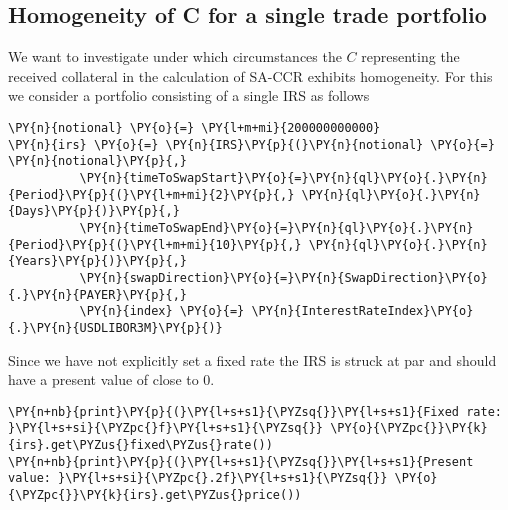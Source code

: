     

    
    \hypertarget{homogeneity-of-c-for-a-single-trade-portfolio}{%
\subsection{Homogeneity of C for a single trade
portfolio}\label{homogeneity-of-c-for-a-single-trade-portfolio}}

    We want to investigate under which circumstances the \(C\) representing
the received collateral in the calculation of SA-CCR exhibits
homogeneity. For this we consider a portfolio consisting of a single IRS
as follows

    \begin{tcolorbox}[breakable, size=fbox, boxrule=1pt, pad at break*=1mm,colback=cellbackground, colframe=cellborder]
\begin{Verbatim}[commandchars=\\\{\}]
\PY{n}{notional} \PY{o}{=} \PY{l+m+mi}{200000000000}
\PY{n}{irs} \PY{o}{=} \PY{n}{IRS}\PY{p}{(}\PY{n}{notional} \PY{o}{=} \PY{n}{notional}\PY{p}{,}
          \PY{n}{timeToSwapStart}\PY{o}{=}\PY{n}{ql}\PY{o}{.}\PY{n}{Period}\PY{p}{(}\PY{l+m+mi}{2}\PY{p}{,} \PY{n}{ql}\PY{o}{.}\PY{n}{Days}\PY{p}{)}\PY{p}{,}
          \PY{n}{timeToSwapEnd}\PY{o}{=}\PY{n}{ql}\PY{o}{.}\PY{n}{Period}\PY{p}{(}\PY{l+m+mi}{10}\PY{p}{,} \PY{n}{ql}\PY{o}{.}\PY{n}{Years}\PY{p}{)}\PY{p}{,}
          \PY{n}{swapDirection}\PY{o}{=}\PY{n}{SwapDirection}\PY{o}{.}\PY{n}{PAYER}\PY{p}{,}
          \PY{n}{index} \PY{o}{=} \PY{n}{InterestRateIndex}\PY{o}{.}\PY{n}{USDLIBOR3M}\PY{p}{)}
\end{Verbatim}
\end{tcolorbox}

    Since we have not explicitly set a fixed rate the IRS is struck at par
and should have a present value of close to 0.

    \begin{tcolorbox}[breakable, size=fbox, boxrule=1pt, pad at break*=1mm,colback=cellbackground, colframe=cellborder]
\begin{Verbatim}[commandchars=\\\{\}]
\PY{n+nb}{print}\PY{p}{(}\PY{l+s+s1}{\PYZsq{}}\PY{l+s+s1}{Fixed rate: }\PY{l+s+si}{\PYZpc{}f}\PY{l+s+s1}{\PYZsq{}} \PY{o}{\PYZpc{}}\PY{k}{irs}.get\PYZus{}fixed\PYZus{}rate())
\PY{n+nb}{print}\PY{p}{(}\PY{l+s+s1}{\PYZsq{}}\PY{l+s+s1}{Present value: }\PY{l+s+si}{\PYZpc{}.2f}\PY{l+s+s1}{\PYZsq{}} \PY{o}{\PYZpc{}}\PY{k}{irs}.get\PYZus{}price())
\end{Verbatim}
\end{tcolorbox}

